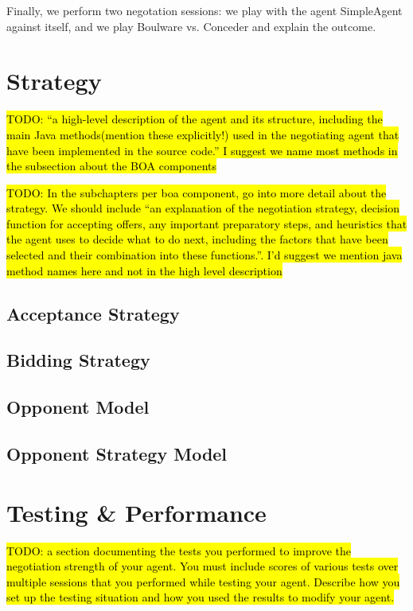 \documentclass[a4paper,10pt]{article}
\newcommand{\todo}[1] {\hl{TODO: #1}}
\begin{document}
Finally, we perform two negotation sessions: we play with the agent SimpleAgent against
itself, and we play Boulware vs. Conceder and explain the outcome.


\section{Strategy}
\label{sec:strategy}

\todo{``a high-level description of the agent and its structure, including the main Java methods(mention these explicitly!) used in the negotiating agent that have been implemented in the source code.''
I suggest we name most methods in the subsection about the BOA components}


\todo{In the subchapters per boa component, go into more detail about the strategy. We should include ``an explanation of the negotiation strategy, decision function for accepting offers, any important preparatory steps, and heuristics that the agent uses to decide what to do next, including the factors that have been selected and their combination into these functions.''.
I'd suggest we mention java method names here and not in the high level description}

\subsection{Acceptance Strategy}
\label{sec:strategyAS}

\subsection{Bidding Strategy}
\label{sec:strategyBS}

\subsection{Opponent Model}
\label{sec:strategyOM}

\subsection{Opponent Strategy Model}
\label{sec:strategyOMS}

\section{Testing \& Performance}
\label{sec:performance}
\todo{a section documenting the tests you performed to improve the negotiation strength of your agent. You must include scores of various tests over multiple sessions that you performed while testing your agent. Describe how you set up the testing situation and how you used the results to modify your agent.}
\end{document}
